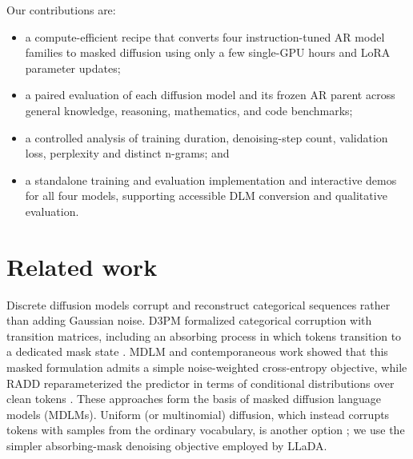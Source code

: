\documentclass{article}
\begin{document}
Our contributions are:
\begin{itemize}
    \item a compute-efficient recipe that converts four instruction-tuned AR model families to masked diffusion using only a few single-GPU hours and LoRA parameter updates;
    \item a paired evaluation of each diffusion model and its frozen AR parent across general knowledge, reasoning, mathematics, and code benchmarks;
    \item a controlled analysis of training duration, denoising-step count, validation loss, perplexity and distinct n-grams; and
    \item a standalone training and evaluation implementation and interactive demos for all four models, supporting accessible DLM conversion and qualitative evaluation.
\end{itemize}

\section{Related work}

Discrete diffusion models corrupt and reconstruct categorical sequences rather than adding Gaussian noise. D3PM formalized categorical corruption with transition matrices, including an absorbing process in which tokens transition to a dedicated mask state \citep{austin2021structured}. MDLM and contemporaneous work showed that this masked formulation admits a simple noise-weighted cross-entropy objective, while RADD reparameterized the predictor in terms of conditional distributions over clean tokens \citep{sahoo2024simple,shi2024simplified,ou2024absorbing}. These approaches form the basis of masked diffusion language models (MDLMs). Uniform (or multinomial) diffusion, which instead corrupts tokens with samples from the ordinary vocabulary, is another option \citep{hoogeboom2021multinomial}; we use the simpler absorbing-mask denoising objective employed by LLaDA.
\end{document}
